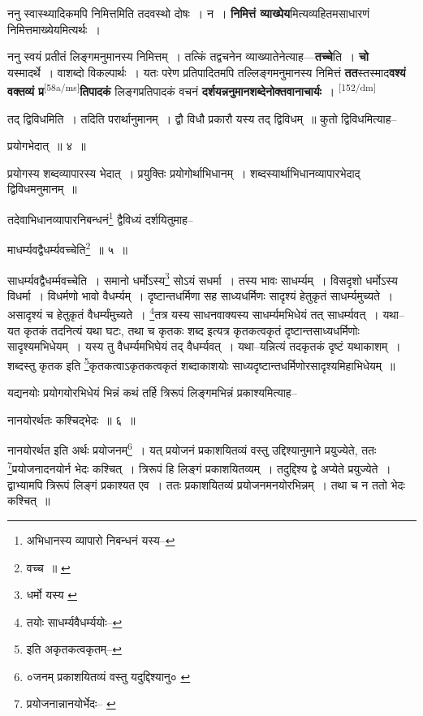 \documentclass[article,12pt,a4paper]{memoir}
\begin{document}
	  \pstart ननु स्वास्थ्यादिकमपि निमित्तमिति तदवस्थो दोषः । न । \textbf{निमित्तं व्याख्पेय}मित्यव्यहितमसाधारणं निमित्तमाख्येयमित्यर्थः ।
	\pend
      

	  \pstart ननु स्वयं प्रतीतं लिङ्गमनुमानस्य निमित्तम् । तत्किं तद्वचनेन व्याख्यातेनेत्याह—\textbf{तच्चे}ति । \textbf{चो} यस्मादर्थे । वाशब्दो विकल्पार्थः । यतः परेण प्रतिपादितमपि तल्लिङ्गमनुमानस्य निमित्तं \textbf{तत}स्तस्माद\textbf{वश्यं वक्तव्यं प्र}\leavevmode\textsuperscript{\rmlatinfont\tiny [58a/ms]}\textbf{तिपादकं} लिङ्गप्रतिपादकं वचनं \textbf{दर्शयन्ननुमानशब्देनोक्तवानाचार्यः} ।
	\pend
      \leavevmode\textsuperscript{\rmlatinfont\tiny [152/dm]}

	  \pstart तद् द्विविधमिति । तदिति परार्थानुमानम् । द्वौ विधौ प्रकारौ यस्य तद् द्विविधम् ॥ कुतो द्विविधमित्याह--
	\pend
       

	  \pstart प्रयोगभेदात् ॥ ४ ॥
	\pend
       

	  \pstart प्रयोगस्य शब्दव्यापारस्य भेदात् । प्रयुक्तिः प्रयोगोर्थाभिधानम् । शब्दस्यार्थाभिधानव्यापारभेदाद् द्विविधमनुमानम् ॥
	\pend
       

	  \pstart तदेवाभिधानव्यापारनिबन्धनं\footnote{अभिधानस्य व्यापारो निबन्धनं यस्य--\cite{dp-msD-n}} द्वैविध्यं दर्शयितुमाह--
	\pend
       

	  \pstart माधर्म्यवद्वैधर्म्यवच्चेति\footnote{वच्च ॥ \cite{dp-msC}} ॥ ५ ॥
	\pend
       

	  \pstart साधर्म्यवद्वैधर्म्मवच्चेति । समानो धर्मोऽस्य\footnote{धर्मो यस्य \cite{dp-msC} \cite{dp-msA} \cite{dp-edP} \cite{dp-edH} \cite{dp-edE} \cite{dp-edN}} सोऽयं सधर्मा । तस्य भावः साधर्म्यम् । विसदृशो धर्मोऽस्य विधर्मा । विधर्मणो भावो वैधर्म्यम् । दृष्टान्तधर्मिणा सह साध्यधर्मिणः सादृश्यं हेतुकृतं साधर्म्यमुच्यते । असादृश्यं च हेतुकृतं वैधर्म्यंमुच्यते । \footnote{तयोः साधर्म्यवैधर्म्ययोः--\cite{dp-msD-n}}तत्र यस्य साधनवाक्यस्य साधर्म्यमभिधेयं तत् साधर्म्यवत् । यथा--यत कृतकं तदनित्यं यथा घटः, तथा च कृतकः शब्द इत्यत्र कृतकत्वकृतं दृष्टान्तसाध्यधर्मिणोः सादृश्यमभिधेयम् । यस्य तु वैधर्म्यमभिघेयं तद् वैधर्म्यवत् । यथा--यन्नित्यं तदकृतकं दृष्टं यथाकाशम् । शब्दस्तु कृतक इति \footnote{इति अकृतकत्वकृतम्--\cite{dp-msC}}कृतकत्वाऽकृतकत्वकृतं शब्दाकाशयोः साध्यदृष्टान्तधर्मिणोरसादृश्यमिहाभिधेयम् ॥
	\pend
       

	  \pstart यद्यनयोः प्रयोगयोरभिधेयं भिन्नं कथं तर्हि त्रिरूपं लिङ्गमभिन्नं प्रकाश्यमित्याह--
	\pend
       

	  \pstart नानयोरर्थतः कश्चिद्भेदः ॥ ६ ॥
	\pend
       

	  \pstart नानयोरर्थत इति अर्थः प्रयोजनम्\footnote{०जनम् प्रकाशयितव्यं वस्तु यदुद्दिश्यानु० \cite{dp-msA} \cite{dp-edP} \cite{dp-edH} \cite{dp-edE} \cite{dp-edN}} । यत् प्रयोजनं प्रकाशयितव्यं वस्तु उद्दिश्यानुमाने प्रयुज्येते, ततः \footnote{प्रयोजनान्नानयोर्भेदः--\cite{dp-msB} \cite{dp-msD}}प्रयोजनादनयोर्न भेदः कश्चित् । त्रिरूपं हि लिङ्गं प्रकाशयितव्यम् । तदुद्दिश्य द्वे अप्येते प्रयुज्येते । द्वाभ्यामपि त्रिरूपं लिङ्गं प्रकाश्यत एव । ततः प्रकाशयितव्यं प्रयोजनमनयोरभिन्नम् । तथा च न ततो भेदः कश्चित् ॥
	\pend
      
\end{document}
